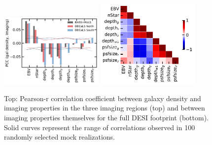 
\begin{figure}
    \includegraphics[width=0.45\textwidth]{figures/pcc.pdf} 
    \includegraphics[width=0.45\textwidth]{figures/pccx.pdf}     
    \caption{Top: Pearson-r correlation coefficient between galaxy density and imaging properties in the three imaging regions (top) and between imaging properties themselves for the full DESI footprint (bottom). Solid curves represent the range of correlations observed in 100 randomly selected mock realizations.}
    \label{fig:pcc}
\end{figure}


